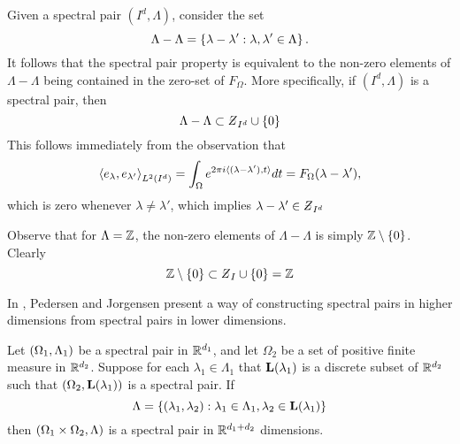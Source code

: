 \documentclass[../thesis.tex]{subfiles}
\begin{document}
\begin{remark}
    Given a spectral pair $(I^d,\Lambda)$, consider the set
    \begin{equation*}
        \Lambda - \Lambda = \left\{\lambda-\lambda' : \lambda,\lambda' \in \Lambda\right\}.
    \end{equation*}
    It follows that the spectral pair property is equivalent to the non-zero elements of $\Lambda - \Lambda$ being contained in the zero-set of $F_{\Omega}$. More specifically, if $(I^d,\Lambda)$ is a spectral pair, then
    \begin{equation*}
        \Lambda - \Lambda \subset \Zstroke_{I^d} \cup \braq{0}
    \end{equation*}
    This follows immediately from the observation that
    \begin{equation*}
        \left \langle e_{\lambda},e_{\lambda'}  \right \rangle_{L^2(I^d)} = \int_\Omega e^{2 \pi i \langle(\lambda-\lambda'),t\rangle} dt = F_{\Omega} (\lambda-\lambda'),
    \end{equation*}
    which is zero whenever $\lambda \neq \lambda'$, which implies $\lambda-\lambda' \in \Zstroke_{I^d}$
\end{remark}

\begin{example}
    Observe that for $\Lambda=\mathbb{Z}$, the non-zero elements of $\Lambda - \Lambda$ is simply $\mathbb{Z}\setminus\{0\}$. Clearly
    \begin{equation*}
        \intnozero \subset \Zstroke_{I} \cup \braq{0} = \Z
    \end{equation*}
\end{example}



In \cite{jorgensenSpectralPairsCartesian2001}, Pedersen and Jorgensen present a way of constructing spectral pairs in higher dimensions from spectral pairs in lower dimensions. 

\begin{theorem}\label{thrm:construction_spectra}
    Let $(\Omega_1,\Lambda_1)$ be a spectral pair in $\mathbb{R}^{d_1}$, and let $\Omega_2$ be a set of positive finite measure in $\mathbb{R}^{d_2}$. Suppose for each $\lambda_1 \in \Lambda_1$ that $\mathbf{L}(\lambda_1)$ is a discrete subset of $\mathbb{R}^{d_2}$ such that $(\Omega_2,\mathbf{L}(\lambda_1))$ is a spectral pair. If 
    \begin{equation*}
        \Lambda = \{(\lambda_1, \lambda_2): \lambda_1\in \Lambda_1, \lambda_2 \in \mathbf{L}(\lambda_1)\} 
    \end{equation*}
    then $(\Omega_1\times\Omega_2, \Lambda)$ is a spectral pair in $\mathbb{R}^{d_1+d_2}$ dimensions. 
\end{theorem}
\end{document}
